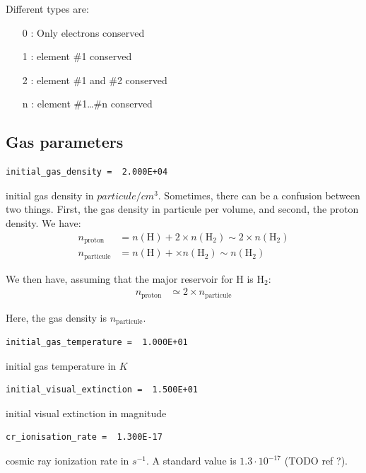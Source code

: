 \documentclass[english,a4paper,twoside]{article}
\begin{document}
Different types are:
\begin{itemize}
\item[0] : Only electrons conserved
\item[1] : element \#1 conserved
\item[2] : element \#1 and \#2 conserved
\item[n] : element \#1\dots\#n conserved
\end{itemize}

\subsection{Gas parameters}


\begin{verbatim}
initial_gas_density =  2.000E+04
\end{verbatim}
initial gas density in $\unit{particule/cm^{3}}$. Sometimes, there can be a confusion between two things. First, the gas density in particule per volume, and second, the proton density. We have:
\begin{align*}
n_\text{proton} &= n(\mathrm{H}) + 2\times n(\mathrm{H_2}) \sim 2\times n(\mathrm{H_2})\\
n_\text{particule} &= n(\mathrm{H}) + \times n(\mathrm{H_2}) \sim n(\mathrm{H_2})
\end{align*}

We then have, assuming that the major reservoir for H is $\mathrm{H_2}$:
\begin{align}
n_\text{proton} &\simeq 2\times n_\text{particule}
\end{align}

Here, the gas density is $n_\text{particule}$.

\begin{verbatim}
initial_gas_temperature =  1.000E+01
\end{verbatim}
initial gas temperature  in $\unit{K}$

\begin{verbatim}
initial_visual_extinction =  1.500E+01
\end{verbatim}
initial visual extinction in magnitude

\begin{verbatim}
cr_ionisation_rate =  1.300E-17
\end{verbatim}
cosmic ray ionization rate in $\unit{s^{-1}}$. A standard value is $1.3\cdot 10^{-17}$ (TODO ref ?).
\end{document}
